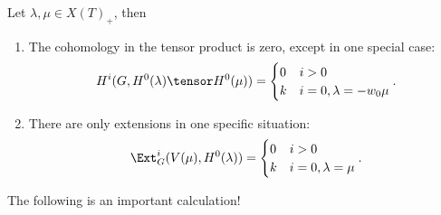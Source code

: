 \begin{theorem}[?]

Let \(\lambda, \mu \in X(T)_+\), then

\begin{enumerate}
\def\labelenumi{\arabic{enumi}.}
\item
  The cohomology in the tensor product is zero, except in one special
  case:
  \begin{align*}  
  H^i(G, H^0(\lambda) \tensor H^0(\mu))
  =
  \begin{cases}
  0 & i>0 \\
  k & i=0, \lambda = -w_0\mu
  \end{cases}
  .\end{align*}
\item
  There are only extensions in one specific situation:
  \begin{align*}  
  \Ext_G^i(V(\mu), H^0(\lambda)) = 
  \begin{cases}
  0 & i> 0 \\
  k & i=0, \lambda = \mu
  \end{cases}
  .\end{align*}
\end{enumerate}

\end{theorem}

The following is an important calculation!

